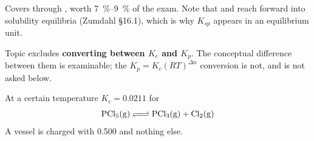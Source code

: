 \documentclass{apchem-exam}
\begin{document}
\apctitleblock

\begin{apcnote}
Covers  through , worth
\SI{7}{\percent}--\SI{9}{\percent} of the exam. Note that  and
 reach forward into solubility equilibria (Zumdahl \S16.1),
which is why $K_{sp}$ appears in an equilibrium unit.

Topic  excludes \textbf{converting between $K_c$ and $K_p$}. The
conceptual difference between them is examinable; the
$K_p = K_c(RT)^{\Delta n}$ conversion is not, and is not asked below.
\end{apcnote}



At a certain temperature $K_c = \num{0.0211}$ for
\[ \ce{PCl5(g) <=> PCl3(g) + Cl2(g)} \]
A vessel is charged with \SI{0.500}{\Molar}  and nothing else.
\end{document}
